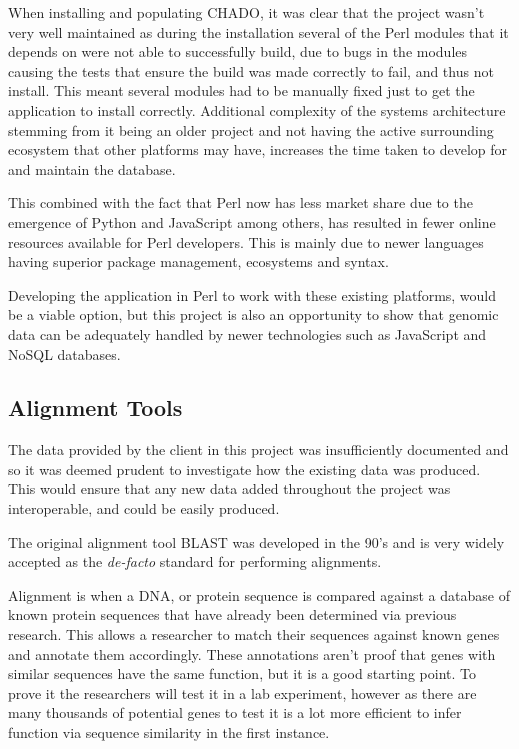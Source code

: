 When installing and populating CHADO, it was clear that the project wasn't very well maintained as during the installation several of the Perl modules that it depends on were not able to successfully build, due to bugs in the modules causing the tests that ensure the build was made correctly to fail, and thus not install. This meant several modules had to be manually fixed just to get the application to install correctly. Additional complexity of the systems architecture stemming from it being an older project and not having the active surrounding ecosystem that other platforms may have, increases the time taken to develop for and maintain the database.

This combined with the fact that Perl now has less market share due to the emergence of Python\cite{python} and JavaScript\cite{node} among others, has resulted in fewer online resources available for Perl developers. This is mainly due to newer languages having superior package management, ecosystems and syntax. 

Developing the application in Perl to work with these existing platforms, would be a viable option, but this project is also an opportunity to show that genomic data can be adequately handled by newer technologies such as JavaScript and NoSQL databases.

\subsection{Alignment Tools}
The data provided by the client in this project was insufficiently documented and so it was deemed prudent to investigate how the existing data was produced. This would ensure that any new data added throughout the project was interoperable, and could be easily produced.

The original alignment tool BLAST\cite{blast} was developed in the 90's and is very widely accepted as the {\it de-facto} standard for performing alignments. 

Alignment is when a DNA, or protein sequence is compared against a database of known protein sequences that have already been determined via previous research. This allows a researcher to match their sequences against known genes and annotate them accordingly. These annotations aren't proof that genes with similar sequences have the same function, but it is a good starting point. To prove it the researchers will test it in a lab experiment, however as there are many thousands of potential genes to test it is a lot more efficient to infer function via sequence similarity in the first instance.

